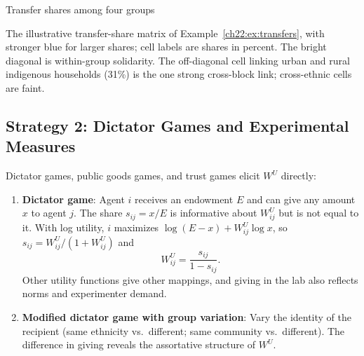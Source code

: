 \documentclass[../structural_economics_book.tex]{subfiles}
\begin{document}
\begin{vizpanel}{Transfer shares among four groups}
\begin{center}
\end{center}
\vspace{-0.5em}
\small The illustrative transfer-share matrix of Example~\ref{ch22:ex:transfers}, with stronger blue for larger shares; cell labels are shares in percent. The bright diagonal is within-group solidarity. The off-diagonal cell linking urban and rural indigenous households (31\%) is the one strong cross-block link; cross-ethnic cells are faint.
\end{vizpanel}


\subsection{Strategy 2: Dictator Games and Experimental Measures}

\begin{definition}\label{ch22:def:experimental}
Dictator games, public goods games, and trust games elicit $W^U$ directly:
\begin{enumerate}
\item \textbf{Dictator game}: Agent $i$ receives an endowment $E$ and can give any amount $x$ to agent $j$. The share $s_{ij} = x/E$ is informative about $W^U_{ij}$ but is not equal to it. With log utility, $i$ maximizes $\log(E - x) + W^U_{ij}\log x$, so $s_{ij} = W^U_{ij}/(1 + W^U_{ij})$ and
\[
W^U_{ij} = \frac{s_{ij}}{1 - s_{ij}} .
\]
Other utility functions give other mappings, and giving in the lab also reflects norms and experimenter demand.
\item \textbf{Modified dictator game with group variation}: Vary the identity of the recipient (same ethnicity vs.\ different; same community vs.\ different). The difference in giving reveals the assortative structure of $W^U$.
\end{enumerate}
\end{definition}
\end{document}
